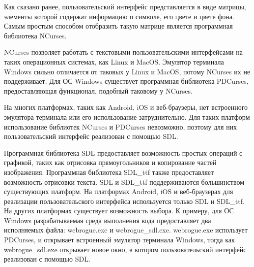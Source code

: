 Как сказано ранее, пользовательский интерфейс представляется в виде матрицы, элементы которой содержат информацию о символе, его цвете и цвете фона.
Самым простым способом отобразить такую матрице является программная библиотека NCurses.

NCurses позволяет работать с текстовыми пользовательскими интерфейсами на таких операционных системах, как Linux и MacOS.
Эмулятор терминала Windows сильно отличается от таковых у Linux и MacOS, потому NCurses их не поддерживает.
Для ОС Windows существует программная библиотека PDCurses, предоставляющая функционал, подобный таковому у NCurses.

На многих платформах, таких как Android, iOS и веб-браузеры, нет встроенного эмулятора терминала или его использование затруднительно.
Для таких платформ использование библиотек NCurses и PDCurses невозможно, поэтому для них пользовательский интерфейс реализован с помощью SDL.

Программная библиотека SDL предоставляет возможность простых операций с графикой, таких как отрисовка прямоугольников и копирование частей изображения.
Программная библиотека SDL\_ttf также предоставляет возможность отрисовки текста.
SDL и SDL\_ttf поддерживаются большинством существующих платформ.
На платформах Android, iOS и веб-браузерах для реализации пользовательского интерфейса используется только SDL и SDL\_ttf.
На других платформах существует возможность выбора. 
К примеру, для ОС Windows разрабатываемая среда выполнения кода предоставляет два исполняемых файла: webrogue.exe и webrogue\_sdl.exe.
webrogue.exe использует PDCurses, и открывает встроенный эмулятор терминала Windows, тогда как webrogue\_sdl.exe открывает новое окно, в котором пользовательский интерфейс реализован с помощью SDL.
